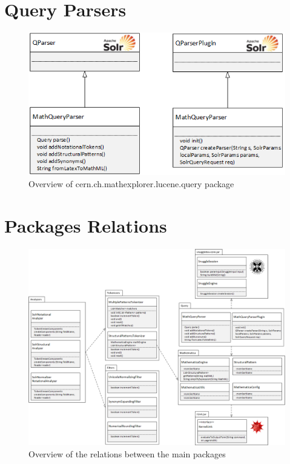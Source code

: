 \section{Query Parsers}
\begin{figure}[h!]
	\centering
	\includegraphics[height=4 cm]{visio_drawings/query.png}
	\caption{Overview of {\small{\codefont cern.ch.mathexplorer.lucene.query}} package}
	\label{uml_filters}
\end{figure}

\section{Packages Relations}
\begin{figure}[h!]
	\centering
	\includegraphics[height=12 cm]{visio_drawings/main_packages.png}
	\caption{Overview of the relations between the main packages}
	\label{uml_filters}
\end{figure}
